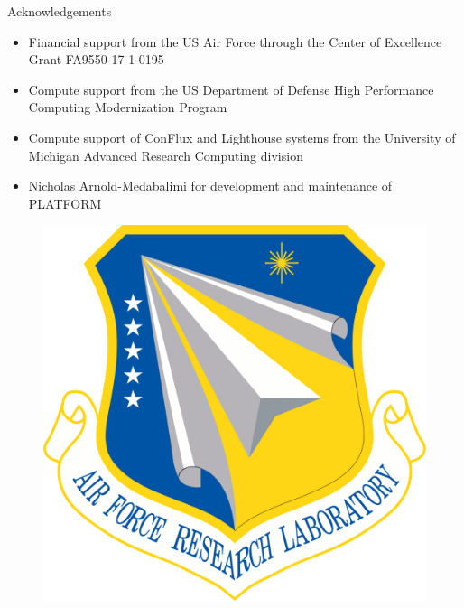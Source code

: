 \documentclass[]{beamer}
\begin{document}
\begin{frame}{Acknowledgements}
	\begin{itemize}
	    \item Financial support from the US Air Force through the Center of Excellence Grant FA9550-17-1-0195
	    \item Compute support from the US Department of Defense High Performance Computing Modernization Program
		\item Compute support of ConFlux and Lighthouse systems from the University of Michigan Advanced Research Computing division
		\item Nicholas Arnold-Medabalimi for development and maintenance of PLATFORM
	\end{itemize}
	\begin{minipage}{0.15\linewidth}
		\vspace{0.5em}
		\begin{figure}
			\includegraphics[width=0.99\linewidth]{back_matter/afrlLogo.png}
		\end{figure}
	\end{minipage}
	\begin{minipage}{0.34\linewidth}
		\begin{figure}

\end{figure}
\end{minipage}
\end{frame}
\end{document}
